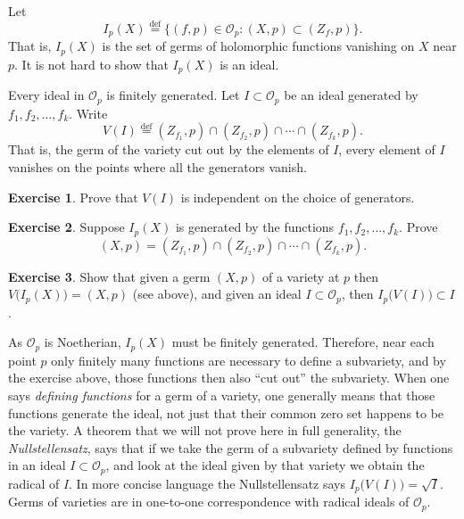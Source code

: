 \documentclass[12pt,openany]{book}
\newcommand{\sO}{{\mathcal{O}}}
\newcommand{\myindex}[1]{#1\index{#1}}
\theoremstyle{plain}
\theoremstyle{remark}
\theoremstyle{definition}
\newenvironment{exbox}{%
    \def\FrameCommand{\vrule width 1pt \relax\hspace {10pt}}%
    \MakeFramed {\advance \hsize -\width \FrameRestore }%
}{%
    \endMakeFramed
}
\theoremstyle{exercise}
\newtheorem{exercise}{Exercise}[section]
\theoremstyle{example}
\begin{document}
Let
\begin{equation*}
I_p(X) \overset{\text{def}}{=}
\bigl\{ (f,p) \in \sO_p : (X,p) \subset (Z_f,p) \bigr\} .
\end{equation*}
That is, $I_p(X)$ is the set of germs of holomorphic functions vanishing on
$X$ near $p$.  It is not hard to show that $I_p(X)$ is an ideal.

Every ideal in $\sO_p$ is finitely generated.
Let $I \subset \sO_p$ be an ideal generated by $f_1,f_2,\ldots,f_k$.
Write
\begin{equation*}
V(I) \overset{\text{def}}{=}
(Z_{f_1},p) \cap (Z_{f_2},p) \cap \cdots \cap (Z_{f_k},p) .
\end{equation*}
That is, the germ of the variety cut out by the elements of $I$, every
element of $I$ vanishes on the points where all the generators vanish.

\begin{exbox}
\begin{exercise}
Prove that $V(I)$ is independent on the choice of generators.
\end{exercise}

\begin{exercise}
Suppose $I_p(X)$ is generated by the functions $f_1, f_2, \ldots, f_k$.
Prove 
\begin{equation*}
(X,p) = (Z_{f_1},p) \cap (Z_{f_2},p) \cap \cdots \cap (Z_{f_k},p) .
\end{equation*}
\end{exercise}

\begin{exercise}
Show that given a germ $(X,p)$ of a variety at $p$ then
$V\bigl(I_p(X)\bigr) = (X,p)$ (see above), and
given an ideal $I \subset \sO_p$, then
$I_p\bigl(V(I)\bigr) \subset I$.
\end{exercise}
\end{exbox}

As $\sO_p$ is Noetherian, $I_p(X)$ must be finitely
generated.  Therefore, near each point $p$ only finitely many functions are
necessary to define a subvariety, and by the exercise above, those functions 
then also ``cut out'' the subvariety.  When one says 
\emph{\myindex{defining functions}} for a germ of a variety, one generally
means that those functions generate the ideal, not just that their common
zero set happens to be the variety.  A theorem that we will not prove here
in full generality,
the \emph{\myindex{Nullstellensatz}}, says that if we take the germ of
a subvariety defined by functions
in an ideal $I \subset \sO_p$, and look at the ideal given by that variety we obtain the
radical of $I$.  In more concise language the Nullstellensatz says
$I_p\bigl(V(I)\bigr) = \sqrt{I}$.
Germs of varieties are in
one-to-one correspondence with radical ideals of $\sO_p$.
\end{document}
